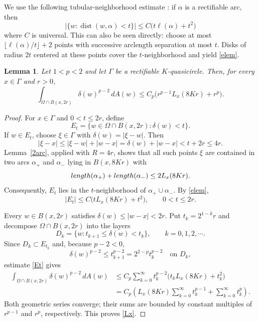 \documentclass[11pt]{article}
\numberwithin{equation}{section}
\newtheorem{lemma}[theorem]{Lemma}
\theoremstyle{remark}
\newcommand{\dist}{\operatorname{dist}}
\begin{document}
We use the following tubular-neighborhood estimate
\cite[Lemma~4.2]{MT}: if $\alpha$ is a rectifiable arc, then
\begin{equation}\label{elem}
  \bigl|\{w:\dist(w,\alpha)<t\}\bigr|
  \le C\bigl(t\ell(\alpha)+t^2\bigr)
\end{equation}
where $C$ is universal.  This can also be seen directly:
choose at most $\lfloor\ell(\alpha)/t\rfloor+2$ points with successive
arclength separation at most $t$.  Disks of radius $2t$ centered at these
points cover the $t$-neighborhood and yield \eqref{elem}.

\begin{lemma}\label{8Kr}
Let $1<p<2$ and let $\Gamma$ be a rectifiable $K$-quasicircle.  Then,
for every $x\in\Gamma$ and $r>0$,
\begin{equation}\label{Lx}
  \int_{\Omega\cap B(x,2r)}\delta(w)^{p-2}\,dA(w)
  \leq C_p\bigl(r^{p-1}L_x(8K r)+r^p\bigr). 
\end{equation}
\end{lemma}

\begin{proof}
For $x\in\Gamma$ and $0<t\le2r$, define
\[
  E_t=\{w\in\Omega\cap B(x,2r):\delta(w)<t\}.
\]
If $w\in E_t$, choose $\xi\in\Gamma$ with
$\delta(w)=|\xi-w|$.  Then
\[
  |\xi-x|
  \le|\xi-w|+|w-x|
  =\delta(w)+|w-x|
  <t+2r\le4r.
\]
Lemma~\ref{2arc}, applied with $R=4r$, shows that all such points $\xi$ are
contained in two arcs $\alpha_+$ and $\alpha_-$ lying in
$B(x,8Kr)$ with
\[
  {\rm length}(\alpha_+)+ {\rm length}(\alpha_-)
  \le2L_x(8K r).
\]
Consequently, $E_t$ lies in the $t$-neighborhood of
$\alpha_+\cup\alpha_-$.  By \eqref{elem},
\begin{equation}\label{Et}
  |E_t|\le C\bigl(tL_x(8K r)+t^2\bigr),
  \qquad 0<t\le2r.
\end{equation}

Every $w\in B(x,2r)$ satisfies $\delta(w)\le|w-x|<2r$.  Put
$t_k=2^{1-k}r$ and decompose $\Omega\cap B(x,2r)$ into the layers
\[
  D_k=\{w:t_{k+1}\le\delta(w)<t_k\},
  \qquad k=0,1,2,\cdots.
\]
Since $D_k\subset E_{t_k}$ and, because $p-2<0$,
\[
\delta(w)^{p-2}\le t_{k+1}^{p-2}=2^{2-p}t_k^{p-2}
\quad\text{on }D_k,
\]
estimate \eqref{Et} gives
\begin{align*}
  \int_{\Omega\cap B(x,2r)}\delta(w)^{p-2}\,dA(w)
  &\le C_p\sum_{k=0}^\infty
  t_k^{p-2}\bigl(t_kL_x(8K r)+t_k^2\bigr)\\
  &=C_p\left(
  L_x(8K r)\sum_{k=0}^\infty t_k^{p-1}
  +\sum_{k=0}^\infty t_k^{p}
  \right).
\end{align*}
Both geometric series converge; their sums are bounded by constant
multiples of $r^{p-1}$ and $r^p$, respectively.  This proves \eqref{Lx}.
\end{proof}
\end{document}
